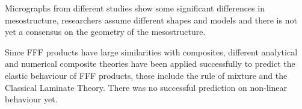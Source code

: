 Micrographs from different studies show some significant differences in mesostructure, researchers assume different shapes and models and there is not yet a consensus on the geometry of the mesostructure. 

Since FFF products have large similarities with composites, different analytical and numerical composite theories have been applied successfully to predict the elastic behaviour of FFF products, these include the rule of mixture and the Classical Laminate Theory. There was no successful prediction on non-linear behaviour yet. 


